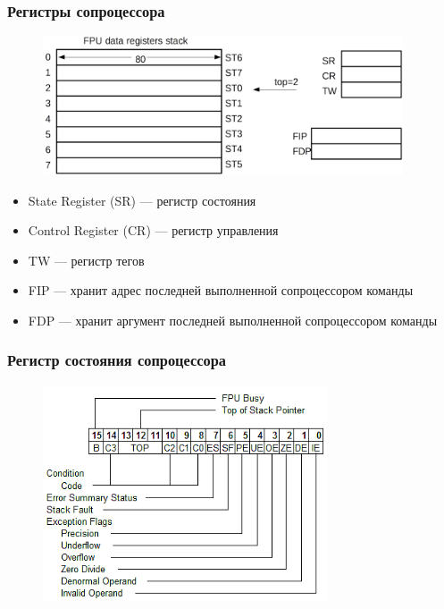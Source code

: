 \documentclass[utf8, russian, aspectratio=1610]{beamer}
\begin{document}
\begin{frame}
    \frametitle{Регистры сопроцессора}
    \begin{figure}
        \centering
        \includegraphics[width=0.95\textwidth]{fig/FPU-crop.png}
    \end{figure}
    \begin{itemize}
        \item State Register (SR)  --- регистр состояния
        \item Control Register (CR) --- регистр управления
        \item TW --- регистр тегов
        \item FIP --- хранит адрес последней выполненной сопроцессором команды
        \item FDP --- хранит аргумент последней выполненной сопроцессором команды
    \end{itemize}
\end{frame}

\begin{frame}
    \frametitle{Регистр состояния сопроцессора}
    \begin{figure}
        \centering
        \includegraphics[width=0.75\textwidth]{fig/SR.png}
    \end{figure}
\end{frame}
\end{document}
